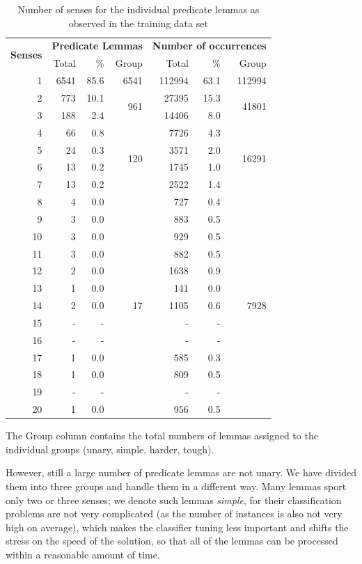 \documentclass[12pt,notitlepage]{report}
\begin{document}
\begin{table}[htbp]
\caption{Number of senses for the individual predicate lemmas as observed in the training data set}\label{tab:senses-num}\footnotesize
\begin{center}
\begin{tabular}{|r|rrr|rrr|}\hline
\multirow{2}{*}{\bf Senses} & \multicolumn{3}{|c|}{\bf Predicate Lemmas} & \multicolumn{3}{|c|}{\bf Number of occurrences} \\
 & Total & \% & Group & Total & \% & Group \\\hline
1 & 6541 & 85.6 & 6541 & 112994 & 63.1 & 112994 \\\hline
2 & 773 & 10.1  & \multirow{2}{*}{961} & 27395 & 15.3 & \multirow{2}{*}{41801} \\
3 & 188 & 2.4 & & 14406 & 8.0 & \\\hline
4 & 66 & 0.8 & \multirow{4}{*}{120} & 7726 & 4.3 & \multirow{4}{*}{16291} \\
5 & 24 & 0.3 & & 3571 & 2.0 & \\
6 & 13 & 0.2 & & 1745 & 1.0 & \\
7 & 13 & 0.2 & & 2522 & 1.4 & \\
8 & 4 & 0.0 & & 727 & 0.4 & \\\hline
9 & 3 & 0.0 & \multirow{11}{*}{17} & 883 & 0.5 & \multirow{11}{*}{7928} \\
10 & 3 & 0.0 & & 929 & 0.5 & \\
11 & 3 & 0.0 & & 882 & 0.5 & \\
12 & 2 & 0.0 & & 1638 & 0.9 & \\
13 & 1 & 0.0 & & 141 & 0.0 & \\
14 & 2 & 0.0 & & 1105 & 0.6 & \\
15 & - & - & & - & - & \\
16 & - & - & & - & - & \\
17 & 1 & 0.0 & & 585 & 0.3 & \\
18 & 1 & 0.0 & & 809 & 0.5 & \\
19 & - & - & & - & - & \\
20 & 1 & 0.0 & & 956 & 0.5 & \\\hline
\end{tabular}
\end{center}
The Group column contains the total numbers of lemmas assigned to the individual groups (unary, simple, harder, tough).
\end{table}

However, still a large number of predicate lemmas are not unary. We have divided them into three groups and handle them in a different way. Many lemmas sport only two or three senses; we denote such lemmas \emph{simple}, for their classification problems are not very complicated (as the number of instances is also not very high on average), which makes the classifier tuning less important and shifts the stress on the speed of the solution, so that all of the lemmas can be processed within a reasonable amount of time.
\end{document}
